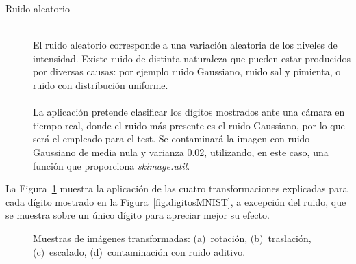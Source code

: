 \begin{description}
	\vspace{50pt}
	\item[Ruido aleatorio] \hfill 
	\vspace{5pt}
	\\
	El ruido aleatorio corresponde a una variación aleatoria de los niveles de intensidad. Existe ruido de distinta naturaleza que pueden estar producidos por diversas causas: por ejemplo ruido Gaussiano, ruido sal y pimienta, o ruido con distribución uniforme.\\
	\vspace{-10pt}
	\\
	La aplicación pretende clasificar los dígitos mostrados ante una cámara en tiempo real, donde el ruido más presente es el ruido Gaussiano, por lo que será el empleado para el test. Se contaminará la imagen con ruido Gaussiano de media nula y varianza 0.02, utilizando, en este caso, una función que proporciona \textit{skimage.util}. 
\end{description}

La Figura~\ref{fig.transformaciones} muestra la aplicación de las cuatro transformaciones explicadas para cada dígito mostrado en la Figura~\ref{fig.digitosMNIST}, a excepción del ruido, que se muestra sobre un único dígito para apreciar mejor su efecto.

\begin{figure}[H]
	\centering
	 \hspace{10pt}
	 \hspace{10pt}
	 \hspace{10pt}
	\caption{Muestras de imágenes transformadas: (a)~rotación, (b)~traslación, (c)~escalado, (d)~contaminación con ruido aditivo.}
	\label{fig.transformaciones}
\end{figure}

